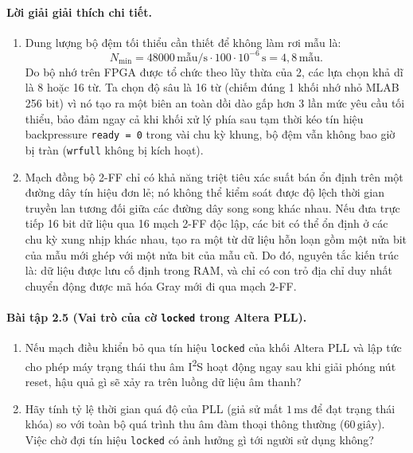 \paragraph{Lời giải giải thích chi tiết.}
\begin{enumerate}[label=\alph*)]
    \item Dung lượng bộ đệm tối thiểu cần thiết để không làm rơi mẫu là:
    \[
    N_{\min} = 48000\,\text{mẫu/s}\cdot 100\cdot 10^{-6}\,\text{s} = 4{,}8\,\text{mẫu}.
    \]
    Do bộ nhớ trên FPGA được tổ chức theo lũy thừa của 2, các lựa chọn khả dĩ là 8 hoặc 16 từ. Ta chọn độ sâu là 16 từ (chiếm đúng 1 khối nhớ nhỏ MLAB 256 bit) vì nó tạo ra một biên an toàn dồi dào gấp hơn 3 lần mức yêu cầu tối thiểu, bảo đảm ngay cả khi khối xử lý phía sau tạm thời kéo tín hiệu backpressure \texttt{ready = 0} trong vài chu kỳ khung, bộ đệm vẫn không bao giờ bị tràn (\texttt{wrfull} không bị kích hoạt).
    \item Mạch đồng bộ 2-FF chỉ có khả năng triệt tiêu xác suất bán ổn định trên một đường dây tín hiệu đơn lẻ; nó không thể kiểm soát được độ lệch thời gian truyền lan tương đối giữa các đường dây song song khác nhau. Nếu đưa trực tiếp 16 bit dữ liệu qua 16 mạch 2-FF độc lập, các bit có thể ổn định ở các chu kỳ xung nhịp khác nhau, tạo ra một từ dữ liệu hỗn loạn gồm một nửa bit của mẫu mới ghép với một nửa bit của mẫu cũ. Do đó, nguyên tắc kiến trúc là: dữ liệu được lưu cố định trong RAM, và chỉ có con trỏ địa chỉ duy nhất chuyển động được mã hóa Gray mới đi qua mạch 2-FF.
\end{enumerate}

\paragraph{Bài tập 2.5 (Vai trò của cờ \texttt{locked} trong Altera PLL).}
\begin{enumerate}[label=\alph*)]
    \item Nếu mạch điều khiển bỏ qua tín hiệu \texttt{locked} của khối Altera PLL và lập tức cho phép máy trạng thái thu âm I\textsuperscript{2}S hoạt động ngay sau khi giải phóng nút reset, hậu quả gì sẽ xảy ra trên luồng dữ liệu âm thanh?
    \item Hãy tính tỷ lệ thời gian quá độ của PLL (giả sử mất $1\,\text{ms}$ để đạt trạng thái khóa) so với toàn bộ quá trình thu âm đàm thoại thông thường ($60\,\text{giây}$). Việc chờ đợi tín hiệu \texttt{locked} có ảnh hưởng gì tới người sử dụng không?
\end{enumerate}


